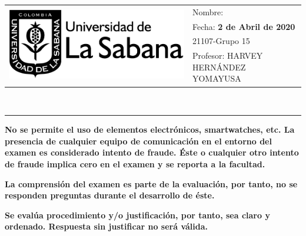 \documentclass[12pt]{exam}
\newcommand{\examdate}{2 de Abril  de 2020}
\begin{document}
	\vspace{1cm}
	\begin{tabular}{ll}
		\multirow{5}{*}{\includegraphics[scale=0.24]{Sabana1.png}}
		& \large\hspace{0.2cm}Nombre: \makebox[3.8in]{\hrulefill}\vspace{0.2cm}\\
		& \large\hspace{0.2cm}Fecha: \textbf{\examdate} \vspace{0.2cm}\\
		& \large\hspace{0.2cm}21107-Grupo 15    \vspace{0.2cm}\\
		& \large\hspace{0.2cm}Profesor:  HARVEY HERNÁNDEZ YOMAYUSA
	\end{tabular}\\
	\rule[2ex]{\textwidth}{1pt} 
	
	\begin{itemize}
		\scriptsize{\item \textbf{No se permite el uso de elementos electrónicos, smartwatches, etc. La presencia de cualquier equipo de comunicación en el entorno del examen es considerado intento de fraude. Éste o cualquier otro intento de fraude implica cero en el examen y se reporta a la facultad.}
			\item \textbf{La comprensión del examen es parte de la evaluación, por tanto, no se responden preguntas durante el desarrollo de éste.} 
			\item \textbf{Se evalúa procedimiento y/o justificación, por tanto, sea claro y ordenado. Respuesta sin justificar no será válida.}
		}	
		
	\end{itemize} 
	
\end{document}
